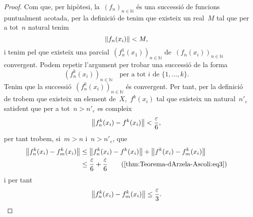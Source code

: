 \documentclass[../equacions-diferencials-I.tex]{subfiles}
\begin{document}
\begin{proof}
        Com que, per hipòtesi, la~\((f_{n})_{n\in\mathbb{N}}\) és una successió de funcions puntualment acotada, per la definició de  tenim que existeix un real~\(M\) tal que per a tot~\(n\) natural tenim
        \[
            \norm{f_{n}(x_{i})}<M,
        \]
        i tenim pel  que existeix una parcial~\((f_{n}^{1}(x_{1}))_{n\in\mathbb{N}}\) de~\((f_{n}(x_{i}))_{n\in\mathbb{N}}\) convergent.
        Podem repetir l'argument per trobar una successió de la forma
        \[
            (f^{k}_{n}(x_{i}))_{n\in\mathbb{N}}\quad\text{per a tot }i\text{ de }\{1,\dots,k\}.
        \]
        Tenim que la successió~\((f^{k}_{n}(x_{i}))_{n\in\mathbb{N}}\) és convergent.
        Per tant, per la definició de  trobem que existeix un element de~\(X\),~\(f^{k}(x_{i})\) tal que existeix un natural~\(n'_{\varepsilon}\) satisfent que per a tot~\(n>n'_{\varepsilon}\) es compleix
        \begin{equation}
            \label{thm:Teorema-dArzela-Ascoli:eq3}
            \norm{f^{k}_{n}(x_{i})-f^{k}(x_{i})}<\frac{\varepsilon}{6},
        \end{equation}
        per tant trobem, si~\(m>n\) i~\(n>n'_{\varepsilon}\), que
        \begin{align*}
            \norm{f^{k}_{n}(x_{i})-f^{k}_{m}(x_{i})}&\leq\norm{f^{k}_{n}(x_{i})-f^{k}(x_{i})}+\norm{f^{k}(x_{i})-f^{k}_{m}(x_{i})} \\
            &\leq\frac{\varepsilon}{6}+\frac{\varepsilon}{6} \tag{\ref{thm:Teorema-dArzela-Ascoli:eq3}}
        \end{align*}
        i per tant
        \begin{equation}
            \label{thm:Teorema-dArzela-Ascoli:eq4}
            \norm{f^{k}_{n}(x_{i})-f^{k}_{m}(x_{i})}\leq\frac{\varepsilon}{3}.
        \end{equation}


\end{proof}
\end{document}
